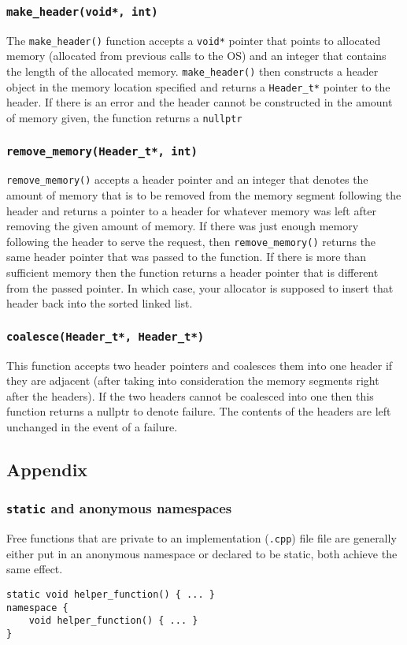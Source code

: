 \documentclass{article}
\begin{document}
\subsubsection{\texttt{make\_header(void*, int)}}
The \texttt{make\_header()} function accepts a \texttt{void*} pointer that
points to allocated memory (allocated from previous calls to the OS) and an
integer that contains the length of the allocated memory.
\texttt{make\_header()} then constructs a header object in the memory location
specified and returns a \texttt{Header\_t*} pointer to the header.  If there
is an error and the header cannot be constructed in the amount of memory
given, the function returns a \texttt{nullptr}

\subsubsection{\texttt{remove\_memory(Header\_t*, int)}}
\texttt{remove\_memory()} accepts a header pointer and an integer that denotes
the amount of memory that is to be removed from the memory segment following
the header and returns a pointer to a header for whatever memory was left
after removing the given amount of memory.  If there was just enough memory
following the header to serve the request, then \texttt{remove\_memory()}
returns the same header pointer that was passed to the function.  If there is
more than sufficient memory then the function returns a header pointer that is
different from the passed pointer.  In which case, your allocator is supposed
to insert that header back into the sorted linked list.

\subsubsection{\texttt{coalesce(Header\_t*, Header\_t*)}}
This function accepts two header pointers and coalesces them into one header
if they are adjacent (after taking into consideration the memory segments
right after the headers).  If the two headers cannot be coalesced into one
then this function returns a nullptr to denote failure.  The contents of the
headers are left unchanged in the event of a failure.


\subsection{Appendix}

\subsubsection{\texttt{static} and anonymous namespaces}
Free functions that are private to an implementation (\texttt{.cpp}) file file
are generally either put in an anonymous namespace or declared to be static,
both achieve the same effect.
\begin{lstlisting}
static void helper_function() { ... }
namespace {
    void helper_function() { ... }
}
\end{lstlisting}
\end{document}
